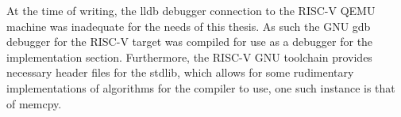 At the time of writing, the lldb debugger connection to the RISC-V QEMU machine
was inadequate for the needs of this thesis. As such the GNU gdb debugger for
the RISC-V target was compiled for use as a debugger for the implementation
section. Furthermore, the RISC-V GNU toolchain provides necessary header files
for the stdlib, which allows for some rudimentary implementations of algorithms
for the compiler to use, one such instance is that of memcpy.

